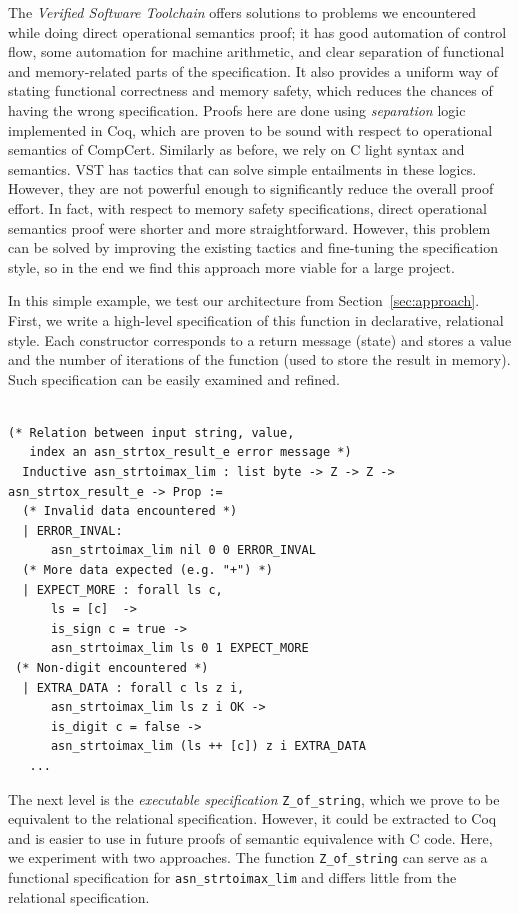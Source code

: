 \documentclass[10p,conference]{IEEEtran}
\begin{document}
The \textit{Verified Software Toolchain} offers solutions
to problems we encountered while doing direct operational semantics
proof; it has good automation of control flow, some automation for
machine arithmetic, and clear separation of functional and
memory-related parts of the specification. It also provides a uniform
way of stating functional correctness and memory safety, which reduces
the chances of having the wrong specification. Proofs here are done
using \textit{separation} logic implemented in Coq,
which are proven to be sound with respect to operational semantics of
CompCert. Similarly as before, we rely on C light syntax and
semantics. VST has tactics that can solve simple entailments in these
logics. However, they are not powerful enough to significantly reduce
the overall proof effort. In fact, with respect to memory safety
specifications, direct operational semantics proof were shorter and
more straightforward. However, this problem can be solved by improving
the existing tactics and fine-tuning the specification style, so in
the end we find this approach more viable for a large project.

In this simple example, we test our architecture from
Section~\ref{sec:approach}. First, we write a high-level specification
of this function in declarative, relational style. Each constructor
corresponds to a return message (state) and stores a value and the
number of iterations of the function (used to store the result in
memory). Such specification can be easily examined and refined.

 \begin{lstlisting}[language=Coq]

(* Relation between input string, value, 
   index an asn_strtox_result_e error message *)
  Inductive asn_strtoimax_lim : list byte -> Z -> Z -> asn_strtox_result_e -> Prop :=
  (* Invalid data encountered *)
  | ERROR_INVAL:
      asn_strtoimax_lim nil 0 0 ERROR_INVAL
  (* More data expected (e.g. "+") *)
  | EXPECT_MORE : forall ls c,
      ls = [c]  ->
      is_sign c = true ->
      asn_strtoimax_lim ls 0 1 EXPECT_MORE
 (* Non-digit encountered *)
  | EXTRA_DATA : forall c ls z i,
      asn_strtoimax_lim ls z i OK ->
      is_digit c = false -> 
      asn_strtoimax_lim (ls ++ [c]) z i EXTRA_DATA
   ...    
  \end{lstlisting}

  The next level is the \textit{executable specification}
  \texttt{Z\_of\_string}, which we prove to be equivalent to the
  relational specification. However, it could be extracted to Coq and
  is easier to use in future proofs of semantic equivalence with C
  code. Here, we experiment with two approaches. The function 
   \texttt{Z\_of\_string} can serve as a functional specification for
  \texttt{asn\_strtoimax\_lim} and differs little from the
  relational specification. 
\end{document}
